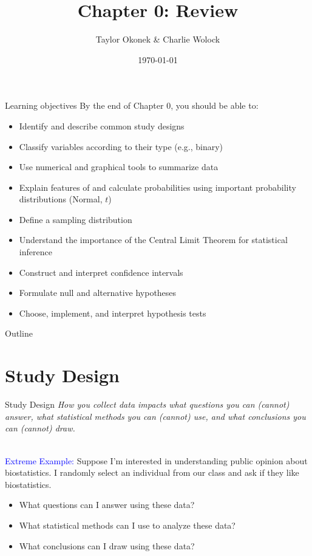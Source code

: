 \documentclass[10pt,t]{beamer}
\title{Chapter 0: Review}
\author{Taylor Okonek \& Charlie Wolock}
\date{\today}
\begin{document}
	\begin{frame}
	\titlepage 
\end{frame}

\begin{frame}{Learning objectives}
By the end of Chapter 0, you should be able to:
\begin{itemize}
	\item Identify and describe common study designs
	\item Classify variables according to their type (e.g., binary)
	\item Use numerical and graphical tools to summarize data
	\item Explain features of and calculate probabilities using important probability distributions (Normal, $t$) 
	\item Define a sampling distribution
	\item Understand the importance of the Central Limit Theorem for statistical inference
	\item Construct and interpret confidence intervals
	\item Formulate null and alternative hypotheses
	\item Choose, implement, and interpret hypothesis tests
\end{itemize}
\end{frame}

\begin{frame}{Outline}
\tableofcontents
\end{frame}


\section{Study Design}

\begin{frame}{Study Design}
\textit{How you collect data impacts what questions you can (cannot) answer, what statistical methods you can (cannot) use, and what conclusions you can (cannot) draw.} \\~\

\textcolor{blue}{Extreme Example:} Suppose I'm interested in understanding public opinion about biostatistics. I randomly select an individual from our class and ask if they like biostatistics.

\begin{itemize}
	\item What questions can I answer using these data?
	\item What statistical methods can I use to analyze these data?
	\item What conclusions can I draw using these data?
\end{itemize}
\end{frame}
\end{document}
